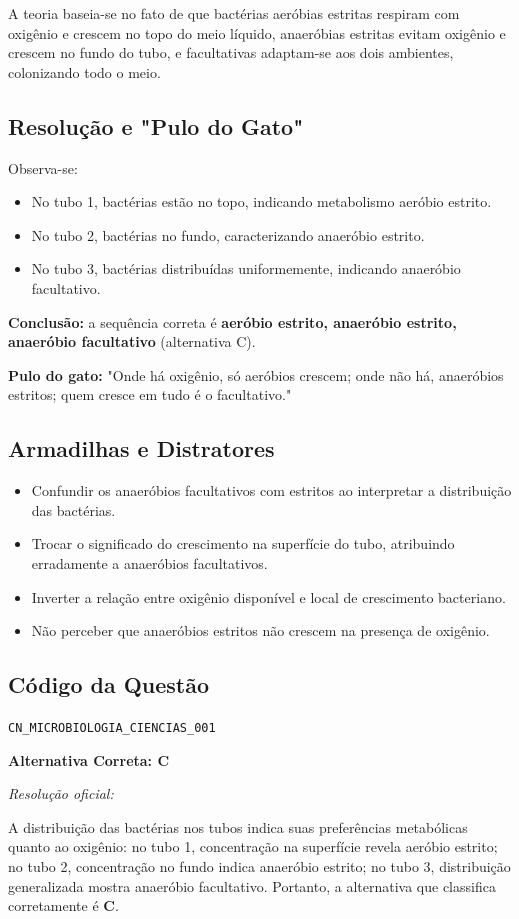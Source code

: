 \documentclass{article}
\begin{document}
A teoria baseia-se no fato de que bactérias aeróbias estritas respiram com oxigênio e crescem no topo do meio líquido, anaeróbias estritas evitam oxigênio e crescem no fundo do tubo, e facultativas adaptam-se aos dois ambientes, colonizando todo o meio.

\subsection*{Resolução e "Pulo do Gato"}
Observa-se:
\begin{itemize}
  \item No tubo 1, bactérias estão no topo, indicando metabolismo aeróbio estrito.
  \item No tubo 2, bactérias no fundo, caracterizando anaeróbio estrito.
  \item No tubo 3, bactérias distribuídas uniformemente, indicando anaeróbio facultativo.
\end{itemize}

\textbf{Conclusão:} a sequência correta é \textbf{aeróbio estrito, anaeróbio estrito, anaeróbio facultativo} (alternativa C).

\textbf{Pulo do gato:} "Onde há oxigênio, só aeróbios crescem; onde não há, anaeróbios estritos; quem cresce em tudo é o facultativo." 

\subsection*{Armadilhas e Distratores}
\begin{itemize}
  \item Confundir os anaeróbios facultativos com estritos ao interpretar a distribuição das bactérias.
  \item Trocar o significado do crescimento na superfície do tubo, atribuindo erradamente a anaeróbios facultativos.
  \item Inverter a relação entre oxigênio disponível e local de crescimento bacteriano.
  \item Não perceber que anaeróbios estritos não crescem na presença de oxigênio.
\end{itemize}

\subsection*{Código da Questão}
\texttt{CN_MICROBIOLOGIA_CIENCIAS_001}

\vspace{1cm}
\begin{center}
\textbf{\large Alternativa Correta: C}
\end{center}

\vspace{0.5cm}
\noindent
\textit{Resolução oficial:} 

A distribuição das bactérias nos tubos indica suas preferências metabólicas quanto ao oxigênio: no tubo 1, concentração na superfície revela aeróbio estrito; no tubo 2, concentração no fundo indica anaeróbio estrito; no tubo 3, distribuição generalizada mostra anaeróbio facultativo. Portanto, a alternativa que classifica corretamente é \textbf{C}.
\end{document}
